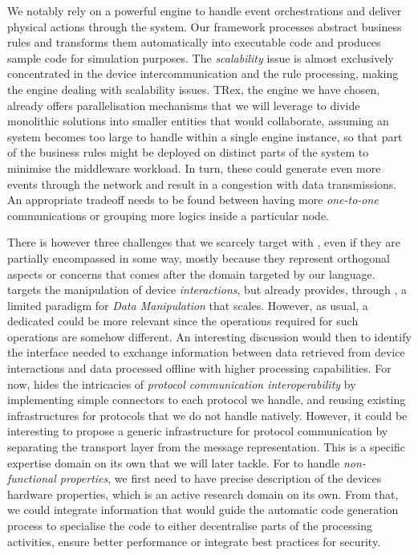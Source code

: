 We notably rely on a powerful \CEP engine to handle event orchestrations and deliver physical actions through the system. Our framework processes abstract business rules and transforms them automatically into executable code and produces sample code for simulation purposes. The \emph{scalability} issue is almost exclusively concentrated in the device intercommunication and the rule processing, making the \CEP engine dealing with scalability issues. TRex, the engine we have chosen, already offers parallelisation mechanisms that we will leverage to divide monolithic solutions into smaller entities that would collaborate, assuming an \IOT system becomes too large to handle within a single engine instance, so that part of the business rules might be deployed on distinct parts of the system to minimise the middleware workload. In turn, these could generate even more events through the network and result in a congestion with data transmissions. An appropriate tradeoff needs to be found between having more \textit{one-to-one} communications or grouping more logics inside a particular node.

There is however three challenges that we scarcely target with \IOTDSL, even if they are partially encompassed in some way, mostly because they represent orthogonal aspects or concerns that comes after the domain targeted by our language. \IOTDSL targets the manipulation of device \emph{interactions}, but already provides, through \CEP, a limited paradigm for \emph{Data Manipulation} that scales. However, as usual, a dedicated \DSL could be more relevant since the operations required for such operations are somehow different. An interesting discussion would then to identify the interface needed to exchange information between data retrieved from device interactions and data processed offline with higher processing capabilities. For now, \IOTDSL hides the intricacies of \emph{protocol communication interoperability} by implementing simple connectors to each protocol we handle, and reusing existing infrastructures for protocols that we do not handle natively. However, it could be interesting to propose a generic infrastructure for protocol communication by separating the transport layer from the message representation. This is a specific expertise domain on its own that we will later tackle. For \IOTDSL to handle \emph{non-functional properties}, we first need to have precise description of the devices hardware properties, which is an active research domain on its own. From that, we could integrate information that would guide the automatic code generation process to specialise the code to either decentralise parts of the processing activities, ensure better performance or integrate best practices for security.